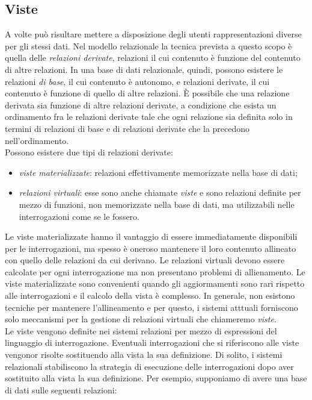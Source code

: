 \documentclass[12pt]{report}
\begin{document}
 	\subsection{Viste}
 	A volte può risultare mettere a disposizione degli utenti rappresentazioni diverse per gli stessi dati. Nel modello relazionale la tecnica prevista a questo scopo è quella delle \textit{relazioni derivate}, relazioni il cui contenuto è funzione del contenuto di altre relazioni. In una base di dati relazionale, quindi, possono esistere le relazioni \textit{di base}, il cui contenuto è autonomo, e relazioni derivate, il cui contenuto è funzione di quello di altre relazioni. È possibile che una relazione derivata sia funzione di altre relazioni derivate, a condizione che esista un ordinamento fra le relazioni derivate tale che ogni relazione sia definita solo in termini di relazioni di base e di relazioni derivate che la precedono nell'ordinamento. \\
 	Possono esistere due tipi di relazioni derivate:
 	\begin{itemize}
 		\item \textit{viste materializzate}: relazioni effettivamente memorizzate nella base di dati;
 		\item \textit{relazioni virtuali}: esse sono anche chiamate \textit{viste} e sono relazioni definite per mezzo di funzioni, non memorizzate nella base di dati, ma utilizzabili nelle interrogazioni come se le fossero.
 	\end{itemize}
 	Le viste materializzate hanno il vantaggio di essere immediatamente disponibili per le interrogazioni, ma spesso è oneroso mantenere il loro contenuto allineato con quello delle relazioni da cui derivano. Le relazioni virtuali devono essere calcolate per ogni interrogazione ma non presentano problemi di allienamento. Le viste materializzate sono convenienti quando gli aggiormamenti sono rari rispetto alle interrogazioni e il calcolo della vista è complesso. In generale, non esistono tecniche per mantenere l'allineamento e per questo, i sistemi atttuali forniscono solo meccanismi per la gestione di relazioni virtuali che chiameremo \textit{viste}. \\
 	Le viste vengono definite nei sistemi relazioni per mezzo di espressioni del linguaggio di interrogazione. Eventuali interrogazioni che si riferiscono alle viste vengonor risolte sostituendo alla vista la sua definizione. Di solito, i sistemi relazionali stabiliscono la strategia di esecuzione delle interrogazioni dopo aver sostituito alla vista la sua definizione. Per esempio, supponiamo di avere una base di dati sulle seguenti relazioni:
\end{document}
